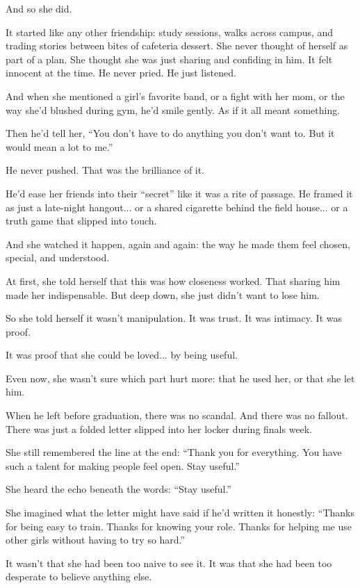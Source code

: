 And so she did.

It started like any other friendship:
study sessions, walks across campus, and trading stories between bites of cafeteria dessert.
She never thought of herself as part of a plan. 
She thought she was just sharing and confiding in him. 
It felt innocent at the time.
He never pried. He just listened.

And when she mentioned a girl’s favorite band, or a fight with her mom, 
or the way she’d blushed during gym, he’d smile gently.
As if it all meant something.

Then he’d tell her,
“You don’t have to do anything you don’t want to. But it would mean a lot to me.”

He never pushed. That was the brilliance of it.

He’d ease her friends into their “secret” like it was a rite of passage.
He framed it as just a late-night hangout... 
or a shared cigarette behind the field house...
or a truth game that slipped into touch.

And she watched it happen, again and again: the way he made them feel chosen, special, and understood.

At first, she told herself that this was how closeness worked. 
That sharing him made her indispensable.
But deep down, she just didn’t want to lose him.

So she told herself it wasn’t manipulation.
It was trust.
It was intimacy.
It was proof.

It was proof that she could be loved... by being useful.

Even now, she wasn’t sure which part hurt more: that he used her, or that she let him.

When he left before graduation,
there was no scandal. And there was no fallout.
There was just a folded letter slipped into her locker during finals week.

She still remembered the line at the end:
``Thank you for everything. You have such a talent for making people feel open. Stay useful.''

She heard the echo beneath the words: ``Stay useful.''

She imagined what the letter might have said if he’d written it honestly:
``Thanks for being easy to train. 
Thanks for knowing your role. 
Thanks for helping me use other girls without having to try so hard.''

It wasn’t that she had been too naive to see it.
It was that she had been too desperate to believe anything else.

